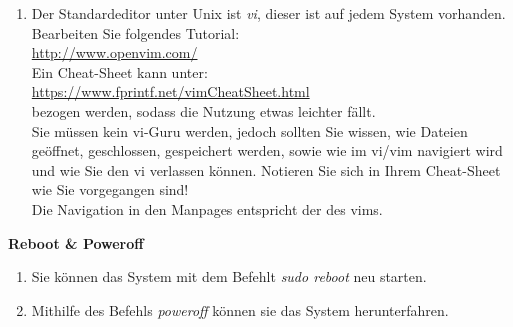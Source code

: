 \documentclass[paper=a4,fontsize=11pt]{scrartcl}%
\numberwithin{equation}{section}
\begin{document}
\begin{enumerate}
	\item Der Standardeditor unter Unix ist \emph{vi}, dieser ist auf jedem System vorhanden. Bearbeiten Sie folgendes Tutorial:\\
	\url{http://www.openvim.com/}\\
	Ein Cheat-Sheet kann unter:\\
	\url{https://www.fprintf.net/vimCheatSheet.html}\\
	bezogen werden, sodass die Nutzung etwas leichter fällt.\\
	Sie müssen kein vi-Guru werden, jedoch sollten Sie wissen, wie Dateien geöffnet, geschlossen, gespeichert werden, sowie wie im vi/vim navigiert wird und wie Sie den vi verlassen können. Notieren Sie sich in Ihrem Cheat-Sheet wie Sie vorgegangen sind!\\
	Die Navigation in den Manpages entspricht der des vims.
\end{enumerate}

\begin{center}\Large{\textbf{Reboot \& Poweroff}}\end{center}\vskip0.25in
\begin{enumerate}
	\item Sie können das System mit dem Befehlt \emph{sudo reboot} neu starten.
	\item Mithilfe des Befehls \emph{poweroff} können sie das System herunterfahren.
\end{enumerate}
\end{document}
